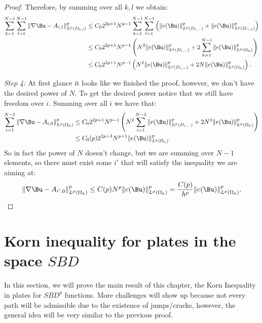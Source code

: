 \begin{proof}
    Therefore, by summing  over all $k,l$ we obtain:
    \begin{align*}
        \sum_{k=1}^{N-1}\sum_{l=1}^{N-1}\|\nabla \Bu- A_{i,1}\|^p_{L^p(D_{k,l})}  & \leq C_0 2^{2p+1}N^{p-1}\sum_{k=1}^{N-1}\sum_{l=1}^{N-1}  \left(\|e(\Bu)\|^p_{L^p(D_{i,-})}+\|e(\Bu)\|^p_{L^p(D_{-,l})}\right)\\
        &\leq C_0 2^{2p+1}N^{p-1}\left( N^2 \|e(\Bu)\|^p_{L^p(D_{i,-})} +  2\sum_{k=1}^{N-1} \|e(\Bu)\|^p_{L^p(\Omega_h)}\right)\\
        &\leq C_0 2^{2p+1}N^{p-1}\left( N^2 \|e(\Bu)\|^p_{L^p(D_{i,-})} +  2N\|e(\Bu)\|^p_{L^p(\Omega_h)}\right).
    \end{align*}
    
    \textit{Step 4:} At first glance it looks like we finished the proof, however, we don't have the desired power of $N$. To get the desired power notice that we still have freedom over $i$. Summing over all $i$ we have that: 
    \begin{align*}
        \sum_{i=1}^{N-1} \|\nabla \Bu - A_{i,0}\|^p_{L^p(\Omega_h)}&\leq C_0 2^{2p+1}N^{p-1}\left( N^2  \sum_{i=1}^{N-1}\|e(\Bu)\|^p_{L^p(D_{i,-})} +  2N^2\|e(\Bu)\|^p_{L^p(\Omega_h)}\right)\\
        &\leq C_0(p) 2^{2p+3}N^{p+1}\|e(\Bu)\|^p_{L^p(\Omega_h)}.
    \end{align*}
    So in fact the power of $N$ doesn't change, but we are summing over $N-1$ elements, so there must exist some  $i'$  that will satisfy the inequality we are aiming at: 
    $$ \|\nabla \Bu - A_{i',0}\|^p_{L^p(\Omega_h)} \leq  C(p)N^{p}\|e(\Bu)\|^p_{L^p(\Omega_h)}=\frac{C(p)}{h^p}\|e(\Bu)\|^p_{L^p(\Omega_h)}.$$
\end{proof}

 \section[Korn inequality for plates in the space SBD]{Korn inequality for plates in the space $SBD$}
    \label{sec:kornPlateSBD}
    In this section, we will prove the main result of this chapter, the  Korn Inequality in plates for $SBD^p$ functions. More challenges will show up because not every path will be admissible due to the existence of jumps/cracks, however, the general idea will be very similar to the previous proof.

